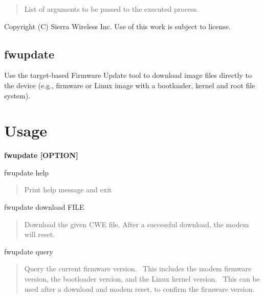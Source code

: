 \begin{DoxyVerb}[ARGS] \end{DoxyVerb}
 \begin{quote}
List of arguments to be passed to the executed process. \end{quote}






Copyright (C) Sierra Wireless Inc. Use of this work is subject to license. \hypertarget{toolsTarget_fwUpdate}{}\subsection{fwupdate}\label{toolsTarget_fwUpdate}
Use the target-\/based Firmware Update tool to download image files directly to the device (e.\+g., firmware or Linux image with a bootloader, kernel and root file system).

\section*{Usage}

{\bfseries {\ttfamily  fwupdate \mbox{[}O\+P\+T\+I\+O\+N\mbox{]} }}

\begin{DoxyVerb}fwupdate help \end{DoxyVerb}
 \begin{quote}
Print help message and exit \end{quote}


\begin{DoxyVerb}fwupdate download FILE \end{DoxyVerb}
 \begin{quote}
Download the given C\+W\+E file. After a successful download, the modem will reset. \end{quote}


\begin{DoxyVerb}fwupdate query \end{DoxyVerb}
 \begin{quote}
Query the current firmware version.~\newline
 This includes the modem firmware version, the bootloader version, and the Linux kernel version.~\newline
 This can be used after a download and modem reset, to confirm the firmware version. \end{quote}






